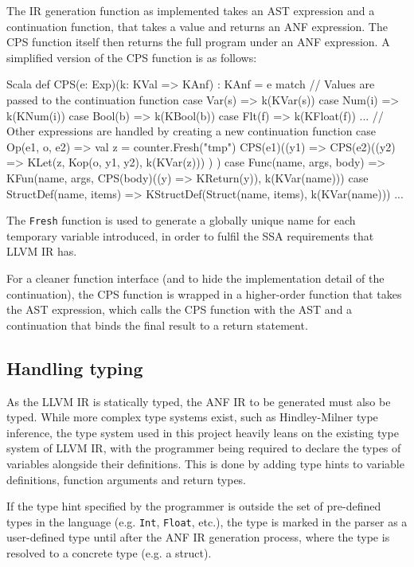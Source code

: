 The IR generation function as implemented takes an AST expression and a continuation function, that
takes a value and returns an ANF expression. The CPS function itself then returns the full program
under an ANF expression. A simplified version of the CPS function is as follows:

\begin{code}{Scala}
    def CPS(e: Exp)(k: KVal => KAnf) : KAnf = e match {
        // Values are passed to the continuation function
        case Var(s) => k(KVar(s))
        case Num(i) => k(KNum(i))
        case Bool(b) => k(KBool(b))
        case Flt(f) => k(KFloat(f))
        ...
        // Other expressions are handled by creating a new continuation function
        case Op(e1, o, e2) => {
            val z = counter.Fresh("tmp")
            CPS(e1)((y1) =>
                CPS(e2)((y2) =>
                    KLet(z, Kop(o, y1, y2), k(KVar(z)))
                )
            )
        }
        case Func(name, args, body) =>
            KFun(name, args, CPS(body)((y) => KReturn(y)), k(KVar(name)))
        case StructDef(name, items) =>
            KStructDef(Struct(name, items), k(KVar(name)))
        ...
    }
\end{code}

The \texttt{Fresh} function is used to generate a globally unique name for each temporary variable
introduced, in order to fulfil the SSA requirements that LLVM IR has.

For a cleaner function interface (and to hide the implementation detail of the continuation), the
CPS function is wrapped in a higher-order function that takes the AST expression, which calls the
CPS function with the AST and a continuation that binds the final result to a return statement.

\subsection{Handling typing}

As the LLVM IR is statically typed, the ANF IR to be generated must also be typed. While more
complex type systems exist, such as Hindley-Milner type inference, the type system used in this
project heavily leans on the existing type system of LLVM IR, with the programmer being required to
declare the types of variables alongside their definitions. This is done by adding type hints to
variable definitions, function arguments and return types.

If the type hint specified by the programmer is outside the set of pre-defined types in the language
(e.g. \texttt{Int}, \texttt{Float}, etc.), the type is marked in the parser as a user-defined type
until after the ANF IR generation process, where the type is resolved to a concrete type (e.g. a
struct).


